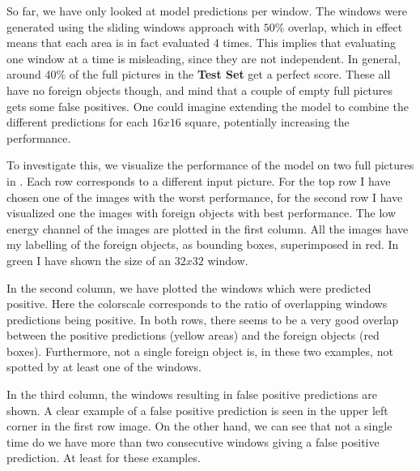 So far, we have only looked at model predictions per window. The windows were generated using the sliding windows approach with $50\%$ overlap, which in effect means that each area is in fact evaluated 4 times. This implies that evaluating one window at a time is misleading, since they are not independent. 
In general, around $40\%$ of the full pictures in the \textbf{Test Set} get a perfect score. These all have no foreign objects though, and mind that a couple of empty full pictures gets some false positives.
One could imagine extending the model to combine the different predictions for each $16x16$ square, potentially increasing the performance. 

To investigate this, we visualize the performance of the model on two full pictures in .
Each row corresponds to a different input picture. 
For the top row I have chosen one of the images with the worst performance, for the second row I have visualized one the images with foreign objects with best performance.
The low energy channel of the images are plotted in the first column. All the images have my labelling of the foreign objects, as bounding boxes, superimposed in red. In green I have shown the size of an $32x32$ window.

In the second column, we have plotted the windows which were predicted positive. Here the colorscale corresponds to the ratio of overlapping windows predictions being positive. In both rows, there seems to be a very good overlap between the positive predictions (yellow areas) and the foreign objects (red boxes). Furthermore, not a single foreign object is, in these two examples, not spotted by at least one of the windows. 

In the third column, the windows resulting in false positive predictions are shown. 
A clear example of a false positive prediction is seen in the upper left corner in the first row image.
On the other hand, we can see that not a single time do we have more than two consecutive windows giving a false positive prediction. At least for these examples.

